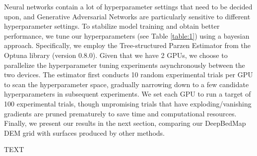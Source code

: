 \documentclass[tc, manuscript]{copernicus}
\begin{document}
Neural networks contain a lot of hyperparameter settings that need to be decided upon, and Generative Adversarial Networks are particularly sensitive to different hyperparameter settings.
To stabilize model training and obtain better performance, we tune our hyperparameters (see Table \ref{table:1}) using a bayesian approach.
Specifically, we employ the Tree-structured Parzen Estimator \citep{BergstraAlgorithmsHyperparameterOptimization2011} from the Optuna library (version 0.8.0).
Given that we have 2 GPUs, we choose to parallelize the hyperparameter tuning experiments asynchronously between the two devices.
The estimator first conducts 10 random experimental trials per GPU to scan the hyperparameter space, gradually narrowing down to a few candidate hyperparameters in subsequent experiments.
We set each GPU to run a target of 100 experimental trials, though unpromising trials that have exploding/vanishing gradients are pruned prematurely to save time and computational resources.
Finally, we present our results in the next section, comparing our DeepBedMap DEM grid with surfaces produced by other methods.


\conclusions  %
TEXT












\appendix
\section{}    %

\subsection{}     %
\end{document}
